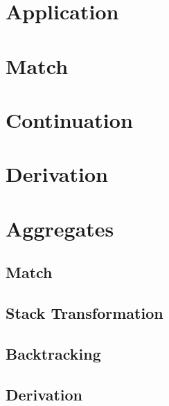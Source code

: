 

%

\section{Application}



\section{Match}





\section{Continuation}




\section{Derivation}





\section{Aggregates}
\subsection{Match}



\subsection{Stack Transformation}

\subsection{Backtracking}



\subsection{Derivation}

